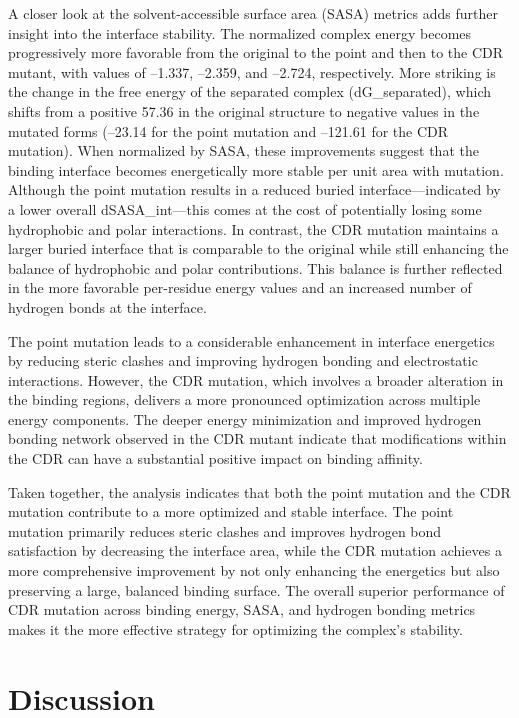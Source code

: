\documentclass[11pt]{article}
\begin{document}
A closer look at the solvent-accessible surface area (SASA) metrics adds further insight into the interface stability. The normalized complex energy becomes progressively more favorable from the original to the point and then to the CDR mutant, with values of –1.337, –2.359, and –2.724, respectively. More striking is the change in the free energy of the separated complex (dG\_separated), which shifts from a positive 57.36 in the original structure to negative values in the mutated forms (–23.14 for the point mutation and –121.61 for the CDR mutation). When normalized by SASA, these improvements suggest that the binding interface becomes energetically more stable per unit area with mutation. Although the point mutation results in a reduced buried interface—indicated by a lower overall dSASA\_int—this comes at the cost of potentially losing some hydrophobic and polar interactions. In contrast, the CDR mutation maintains a larger buried interface that is comparable to the original while still enhancing the balance of hydrophobic and polar contributions. This balance is further reflected in the more favorable per-residue energy values and an increased number of hydrogen bonds at the interface.

The point mutation leads to a considerable enhancement in interface energetics by reducing steric clashes and improving hydrogen bonding and electrostatic interactions. However, the CDR mutation, which involves a broader alteration in the binding regions, delivers a more pronounced optimization across multiple energy components. The deeper energy minimization and improved hydrogen bonding network observed in the CDR mutant indicate that modifications within the CDR can have a substantial positive impact on binding affinity.

Taken together, the analysis indicates that both the point mutation and the CDR mutation contribute to a more optimized and stable interface. The point mutation primarily reduces steric clashes and improves hydrogen bond satisfaction by decreasing the interface area, while the CDR mutation achieves a more comprehensive improvement by not only enhancing the energetics but also preserving a large, balanced binding surface. The overall superior performance of CDR mutation across binding energy, SASA, and hydrogen bonding metrics makes it the more effective strategy for optimizing the complex’s stability.

\section{Discussion}
\end{document}
